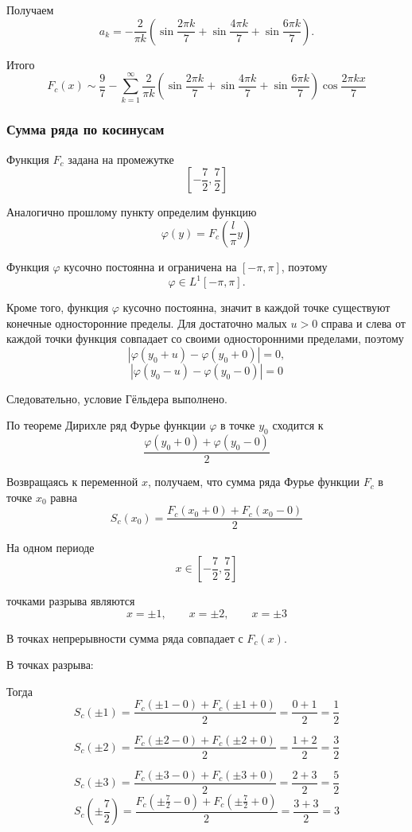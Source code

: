 \documentclass[12pt,a4paper]{article}
\begin{document}
Получаем
\[
a_k=
-\frac2{\pi k}
\left(
\sin\frac{2\pi k}{7}
+
\sin\frac{4\pi k}{7}
+
\sin\frac{6\pi k}{7}
\right).
\]

Итого
\[
F_c(x)\sim
\frac97
-
\sum_{k=1}^{\infty}
\frac2{\pi k}
\left(
\sin\frac{2\pi k}{7}
+
\sin\frac{4\pi k}{7}
+
\sin\frac{6\pi k}{7}
\right)
\cos\frac{2\pi kx}{7}
\]

\subsubsection*{Сумма ряда по косинусам}

Функция \(F_c\) задана на промежутке
\[
\left[-\frac72,\frac72\right]
\]

Аналогично прошлому пункту определим функцию
\[
\varphi(y)=F_c\left(\frac{l}{\pi}y\right)
\]

Функция \(\varphi\) кусочно постоянна и ограничена на \([-\pi,\pi]\),
поэтому
\[
\varphi\in L^1[-\pi,\pi].
\]

Кроме того, функция \(\varphi\) кусочно постоянна, значит в каждой точке
существуют конечные односторонние пределы. Для достаточно малых \(u>0\)
справа и слева от каждой точки функция совпадает со своими односторонними
пределами, поэтому
\[
|\varphi(y_0+u)-\varphi(y_0+0)|=0,
\]
\[
|\varphi(y_0-u)-\varphi(y_0-0)|=0
\]

Следовательно, условие Гёльдера выполнено.

По теореме Дирихле ряд Фурье функции \(\varphi\) в точке \(y_0\) сходится к
\[
\frac{\varphi(y_0+0)+\varphi(y_0-0)}{2}
\]

Возвращаясь к переменной \(x\), получаем, что сумма ряда Фурье функции
\(F_c\) в точке \(x_0\) равна
\[
S_c(x_0)=
\frac{F_c(x_0+0)+F_c(x_0-0)}{2}
\]

На одном периоде
\[
x\in\left[-\frac72,\frac72\right]
\]

точками разрыва являются
\[
x=\pm1,\qquad x=\pm2,\qquad x=\pm3
\]

В точках непрерывности сумма ряда совпадает с \(F_c(x)\).

В точках разрыва:

Тогда
\[
S_c(\pm 1)=
\frac{F_c(\pm 1-0)+F_c(\pm 1+0)}{2}
=
\frac{0+1}{2}
=
\frac12
\]

\[
S_c(\pm 2)=
\frac{F_c(\pm 2-0)+F_c(\pm 2+0)}{2}
=
\frac{1+2}{2}
=
\frac32
\]

\[
S_c(\pm 3)=
\frac{F_c(\pm 3-0)+F_c(\pm 3+0)}{2}
=
\frac{2+3}{2}
=
\frac52
\]
\[
S_c(\pm \frac72)=
\frac{
F_c(\pm \frac72-0)
+
F_c(\pm \frac72+0)
}{2}
=
\frac{3+3}{2}
=
3
\]
\end{document}

